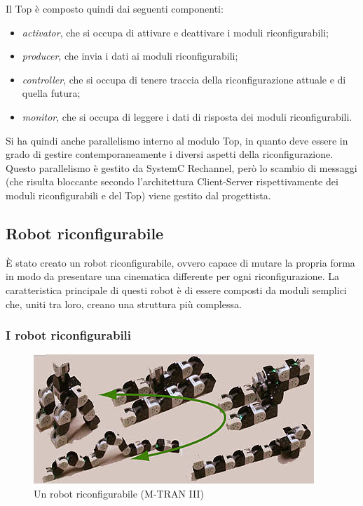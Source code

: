 \documentclass[11pt]{article} %
\begin{document}
Il Top è composto quindi dai seguenti componenti:

\begin{itemize}
  \item \textit{activator}, che si occupa di attivare e deattivare i moduli riconfigurabili;
  \item \textit{producer}, che invia i dati ai moduli riconfigurabili;
  \item \textit{controller}, che si occupa di tenere traccia della riconfigurazione attuale e di quella futura;
  \item \textit{monitor}, che si occupa di leggere i dati di risposta dei moduli riconfigurabili.
\end{itemize}

Si ha quindi anche parallelismo interno al modulo Top, in quanto deve essere in grado di gestire contemporaneamente i diversi aspetti della riconfigurazione. Questo parallelismo è gestito da SystemC Rechannel, però lo scambio di messaggi (che risulta bloccante secondo l'architettura Client-Server rispettivamente dei moduli riconfigurabili e del Top) viene gestito dal progettista.

\subsection{Robot riconfigurabile}

È stato creato un robot riconfigurabile, ovvero capace di mutare la propria forma in modo da presentare una cinematica differente per ogni riconfigurazione. La caratteristica principale di questi robot è di essere composti da moduli semplici che, uniti tra loro, creano una struttura più complessa.


\subsubsection{I robot riconfigurabili}

\begin{figure}[htbp]
\centering
\includegraphics[scale=0.5]{robot_riconfigurabile1.jpg}
\caption{Un robot riconfigurabile (M-TRAN III)}\label{fig:9}
\end{figure}
\end{document}
